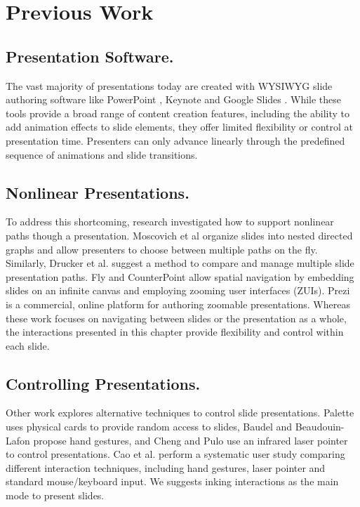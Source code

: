 
\section{Previous Work}

\subsection{Presentation Software.} The vast majority of presentations today are created with WYSIWYG slide authoring software like PowerPoint \cite{powerpoint2017}, Keynote \cite{keynote2017} and Google Slides \cite{googleslides2017}. 
%
While these tools provide a broad range of content creation features, including the ability to add animation effects to slide elements, 
they offer limited flexibility or control at presentation time. 
%
Presenters can only advance linearly through the predefined sequence of animations and slide transitions.

\subsection{Nonlinear Presentations.} 
To address this shortcoming, research investigated how to support nonlinear paths though a presentation. Moscovich et al \cite{moscovich2004customizable} organize slides into nested directed graphs and allow presenters to choose between multiple paths on the fly. Similarly, Drucker et al. \cite{drucker2006comparing} suggest a method to compare and manage multiple slide presentation paths. Fly \cite{lichtschlag2009fly} and CounterPoint \cite{good2002zoomable} allow spatial navigation by embedding slides on an infinite canvas and employing zooming user interfaces (ZUIs). Prezi \cite{prezi2017} is a commercial, online platform for authoring zoomable presentations. Whereas these work focuses on navigating between slides or the presentation as a whole, the interactions presented in this chapter provide flexibility and control within each slide.

\subsection{Controlling Presentations.} 
Other work explores alternative techniques to control slide presentations. Palette \cite{nelson1999palette} uses physical cards to provide random access to slides, Baudel and Beaudouin-Lafon \cite{baudel1993charade} propose hand gestures, and Cheng and Pulo \cite{cheng2003direct} use an infrared laser pointer to control presentations. Cao et al. \cite{cao2005evaluation} perform a systematic user study comparing different interaction techniques, including hand gestures, laser pointer and standard mouse/keyboard input. We suggests inking interactions as the main mode to present slides.

